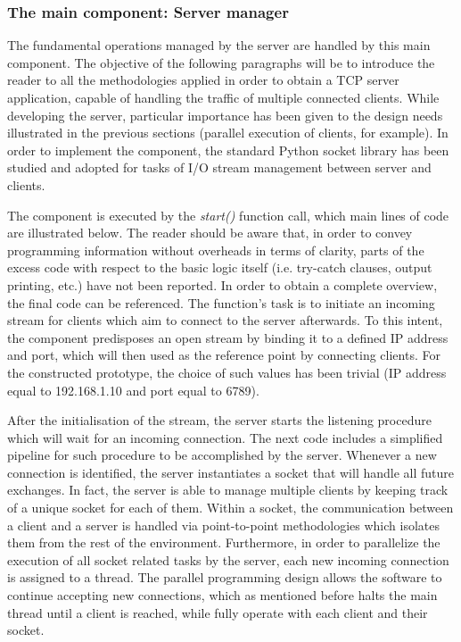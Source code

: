 \newpage
\subsubsection{The main component: Server manager}
The fundamental operations managed by the server are handled by this main component. The objective of the following paragraphs will be to introduce the reader to all the methodologies applied in order to obtain a TCP server application, capable of handling the traffic of multiple connected clients. While developing the server, particular importance has been given to the design needs illustrated in the previous sections (parallel execution of clients, for example). In order to implement the component, the standard Python socket library has been studied and adopted for tasks of I/O stream management between server and clients.

\medskip
The component is executed by the \textit{start()} function call, which main lines of code are illustrated below. The reader should be aware that, in order to convey programming information without overheads in terms of clarity, parts of the excess code with respect to the basic logic itself (i.e. try-catch clauses, output printing, etc.) have not been reported. In order to obtain a complete overview, the final code can be referenced. The function's task is to initiate an incoming stream for clients which aim to connect to the server afterwards. To this intent, the component predisposes an open stream by binding it to a defined IP address and port, which will then used as the reference point by connecting clients. For the constructed prototype, the choice of such values has been trivial (IP address equal to 192.168.1.10 and port equal to 6789).

\vspace{0.5cm}

\vspace{0.5cm}

After the initialisation of the stream, the server starts the listening procedure which will wait for an incoming connection. The next code includes a simplified pipeline for such procedure to be accomplished by the server. Whenever a new connection is identified, the server instantiates a socket that will handle all future exchanges. In fact, the server is able to manage multiple clients by keeping track of a unique socket for each of them. Within a socket, the communication between a client and a server is handled via point-to-point methodologies which isolates them from the rest of the environment. Furthermore, in order to parallelize the execution of all socket related tasks by the server, each new incoming connection is assigned to a thread. The parallel programming design allows the software to continue accepting new connections, which as mentioned before halts the main thread until a client is reached, while fully operate with each client and their socket.

